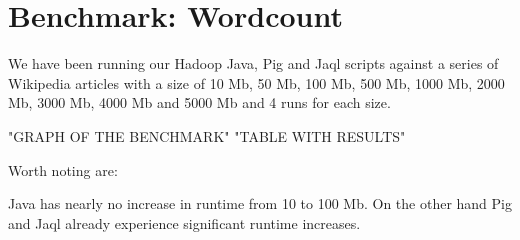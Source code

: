 \section{Benchmark: Wordcount}            

We have been running our Hadoop Java, Pig and Jaql scripts against a series of Wikipedia articles with a size of 10 Mb, 50 Mb, 100 Mb, 500 Mb, 1000 Mb, 2000 Mb, 3000 Mb, 4000 Mb and 5000 Mb and 4 runs for each size.

{"GRAPH OF THE BENCHMARK"}
{"TABLE WITH RESULTS"}

Worth noting are:

Java has nearly no increase in runtime from 10 to 100 Mb. On the other hand Pig and Jaql already experience significant runtime increases.